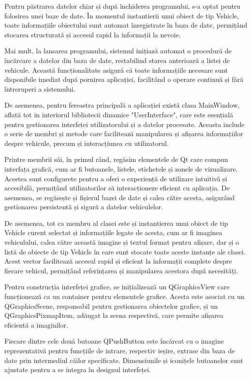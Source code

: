 \documentclass[a4paper,12pt]{report}
\begin{document}
Pentru păstrarea datelor chiar și după închiderea programului, s-a optat pentru folosirea unei baze de date. În momentul instantierii unui obiect de tip Vehicle, toate informațiile obiectului sunt automat înregistrate în baza de date, permițând stocarea structurată și accesul rapid la informații la nevoie.

Mai mult, la lansarea programului, sistemul inițiază automat o procedură de încărcare a datelor din baza de date, restabilind starea anterioară a listei de vehicule. Această funcționalitate asigură că toate informațiile necesare sunt disponibile imediat după pornirea aplicației, facilitând o operare continuă și fără întreruperi a sistemului.

De asemenea, pentru fereastra principală a aplicației există clasa MainWindow, aflată tot in interiorul bibliotecii dinamice "UserInterface", care este esențială pentru gestionarea interfeței utilizatorului și a datelor procesate. Aceasta include o serie de membri și metode care facilitează manipularea și afișarea informațiilor despre vehicule, precum și interacțiunea cu utilizatorul.

Printre membrii săi, în primul rând, regăsim elementele de Qt care compun interfața grafică, cum ar fi butoanele, listele, etichetele și zonele de vizualizare. Acestea sunt configurete pentru a oferi o experiență de utilizare intuitivă și accesibilă, permițând utilizatorilor să interacționeze eficient cu aplicația. De asemenea, se regăsește și fișierul bazei de date și calea către acesta, asigurând gestionarea persistentă și sigură a datelor vehiculelor.

De asemenea, tot ca membru al clasei este și instantierea unui obiect de tip Vehicle curent selectat și informațiile legate de acesta, cum ar fi imaginea vehiculului, calea către această imagine și textul format pentru afișare, dar și o listă de obiecte de tip Vehicle în care sunt stocate toate aceste instanțe ale clasei. Acest vector facilitează accesul rapid și eficient la informații complete despre fiecare vehicul, permițând referințarea și manipularea acestora după necesități.

Pentru construcția interfeței grafice, se inițializează un QGraphicsView care funcționează ca un container pentru elementele grafice. Acesta este asociat cu un QGraphicsScene, responsabil pentru gestionarea obiectelor grafice, și un QGraphicsPixmapItem, adăugat la scena respectivă, care permite afișarea eficientă a imaginilor.

Fiecare dintre cele două butoane QPushButton este încărcat cu o imagine reprezentativă pentru funcțiile de intrare, respectiv ieșire, extrase din baza de date prin intermediul căilor specificate. Dimensiunile și iconițele butoanelor sunt ajustate pentru a se integra în designul interfeței.
\end{document}
